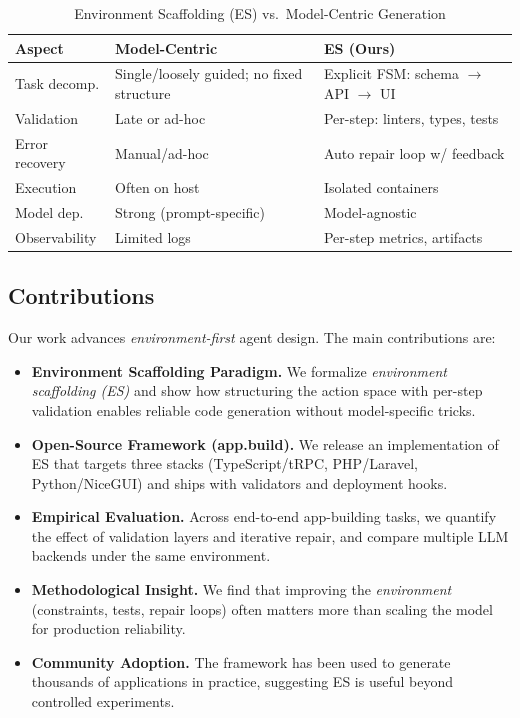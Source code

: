 \documentclass[conference]{IEEEtran}
\begin{document}
\begin{table}[t]
\centering
\footnotesize
\begin{threeparttable}
\caption{Environment Scaffolding (ES) vs.\ Model-Centric Generation}
\label{tab:es-contrast}
\begin{tabular}{@{}p{1.8cm}p{2.8cm}p{2.8cm}@{}}
\toprule
\textbf{Aspect} & \textbf{Model-Centric} & \textbf{ES (Ours)} \\
\midrule
Task decomp. & Single/loosely guided; no fixed structure &
Explicit FSM: schema $\rightarrow$ API $\rightarrow$ UI \\
Validation & Late or ad-hoc &
Per-step: linters, types, tests \\
Error recovery & Manual/ad-hoc &
Auto repair loop w/ feedback \\
Execution & Often on host &
Isolated containers \\
Model dep. & Strong (prompt-specific) &
Model-agnostic \\
Observability & Limited logs &
Per-step metrics, artifacts \\
\bottomrule
\end{tabular}
\end{threeparttable}
\end{table}

\subsection{Contributions}

Our work advances \emph{environment-first} agent design. The main contributions are:

\begin{itemize}
  \item \textbf{Environment Scaffolding Paradigm.} We formalize \emph{environment scaffolding (ES)} and show how structuring the action space with per-step validation enables reliable code generation without model-specific tricks.
  \item \textbf{Open-Source Framework (app.build).} We release an implementation of ES that targets three stacks (TypeScript/tRPC, PHP/Laravel, Python/NiceGUI) and ships with validators and deployment hooks.
  \item \textbf{Empirical Evaluation.} Across end-to-end app-building tasks, we quantify the effect of validation layers and iterative repair, and compare multiple LLM backends under the same environment.
  \item \textbf{Methodological Insight.} We find that improving the \emph{environment} (constraints, tests, repair loops) often matters more than scaling the model for production reliability.
  \item \textbf{Community Adoption.} The framework has been used to generate thousands of applications in practice, suggesting ES is useful beyond controlled experiments.
\end{itemize}
\end{document}
